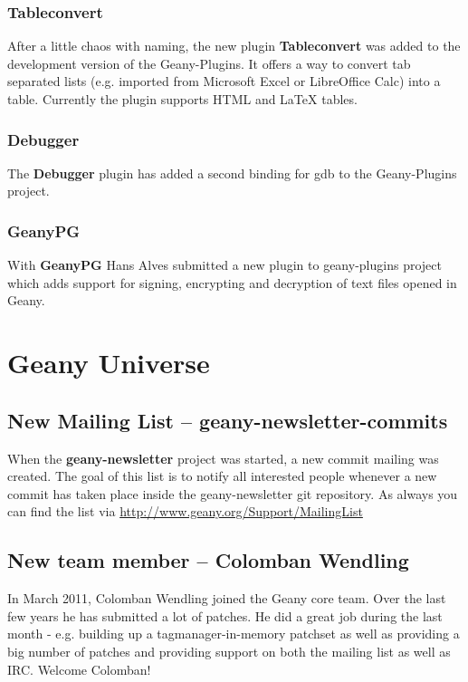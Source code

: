 \documentclass[%
paper=a4,%
fontsize=12pt,%
twoside=false,%
DIV18,
headsepline,
plainheadsepline,
footsepline,
plainfootsepline,
parskip=half,%
openany,%
]{scrartcl}
\begin{document}
\subsubsection{Tableconvert}

After a little chaos with naming, the new plugin \textbf{Tableconvert}
was added to the development version of the Geany-Plugins. It
offers a way to convert tab separated lists (e.g. imported
from Microsoft Excel or LibreOffice Calc) into a table. Currently the
plugin supports HTML and \LaTeX{} tables.

\subsubsection{Debugger}

The \textbf{Debugger} plugin has added a second binding for gdb to
the Geany-Plugins project.

\subsubsection{GeanyPG}

With \textbf{GeanyPG} Hans Alves submitted a new plugin to
geany-plugins project which adds support for signing,
encrypting and decryption of text files opened in Geany.

\section{Geany Universe}

\subsection{New Mailing List -- geany-newsletter-commits}

When the \textbf{geany-newsletter} project was started, a
new commit mailing was created. The goal of this list is
to notify all interested people whenever a new commit has taken place
inside the geany-newsletter git repository. As always you can find
the list via \url{http://www.geany.org/Support/MailingList}

\subsection{New team member -- Colomban Wendling}

In March 2011, Colomban Wendling joined the Geany core team. Over
the last few years he has submitted a lot of patches. He did a great
job during the last month - e.g. building up a tagmanager-in-memory
patchset as well as providing a big number of patches and providing
support on both the mailing list as well as IRC. Welcome Colomban!
\end{document}
